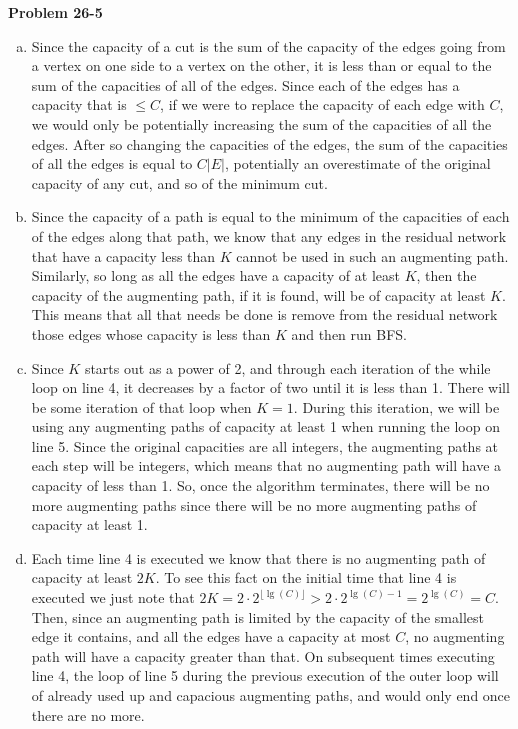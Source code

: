 \documentclass{article}
\begin{document}
\noindent\textbf{Problem 26-5}\\

\begin{enumerate}[a.]
\item Since the capacity of a cut is the sum of the capacity of the edges going from a vertex on one side to a vertex on the other, it is less than or equal to the sum of the capacities of all of the edges. Since each of the edges has a capacity that is $\le C$, if we were to replace the capacity of each edge with $C$, we would only be potentially increasing the sum of the capacities of all the edges. After so changing the capacities of the edges, the sum of the capacities of all the edges is equal to $C|E|$, potentially an overestimate of the original capacity of any cut, and so of the minimum cut.
\item
Since the capacity of a path is equal to the minimum of the capacities of each of the edges along that path, we know that any edges in the residual network that have a capacity less than $K$ cannot be used in such an augmenting path. Similarly, so long as all the edges have a capacity of at least $K$, then the capacity of the augmenting path, if it is found, will be of capacity at least $K$. This means that all that needs be done is remove from the residual network those edges whose capacity is less than $K$ and then run BFS.
\item
Since $K$ starts out as a power of 2, and through each iteration of the while loop on line 4, it decreases by a factor of two until it is less than 1. There will be some iteration of that loop when $K=1$. During this iteration, we will be using any augmenting paths of capacity at least 1 when running the loop on line 5. Since the original capacities are all integers, the augmenting paths at each step will be integers, which means that no augmenting path will have a capacity of less than 1. So, once the algorithm terminates, there will be no more augmenting paths since there will be no more augmenting paths of capacity at least 1.
\item
Each time line 4 is executed we know that there is no augmenting path of capacity at least $2K$. To see this fact on the initial time that line 4 is executed we just note that $2 K = 2\cdot 2^{\lfloor \lg(C)\rfloor} > 2\cdot2^{\lg(C) -1} = 2^{\lg(C)} = C$. Then, since an augmenting path is limited by the capacity of the smallest edge it contains, and all the edges have a capacity at most $C$, no augmenting path will have a capacity greater than that. On subsequent times executing line 4, the loop of line 5 during the previous execution of the outer loop will of already used up and capacious augmenting paths, and would only end once there are no more. 


\end{enumerate}
\end{document}
